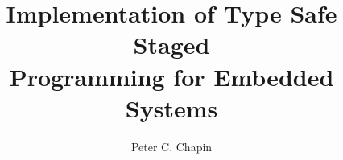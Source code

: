 \documentclass[11pt]{report}
\begin{document}
\title{Implementation of Type Safe Staged\\Programming for Embedded Systems}
\author{Peter C. Chapin}
\maketitle
%
\makeacceptance
{}


\clearpage


\clearpage


%


\singlespace

\tableofcontents
\clearpage

\listoftables
\clearpage

\listoffigures

%

\doublespace

\clearpage
{}






\end{document}
